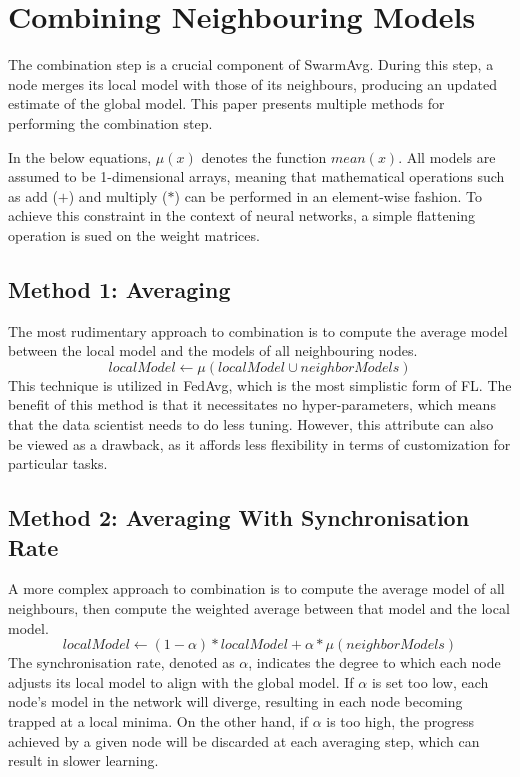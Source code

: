 \section{Combining Neighbouring Models} \label{mcm}
The combination step is a crucial component of SwarmAvg. During this step, a node merges its local model with those of its neighbours, producing an updated estimate of the global model. This paper presents multiple methods for performing the combination step.

In the below equations, $\mu(x)$ denotes the function $mean(x)$. All models are assumed to be 1-dimensional arrays, meaning that mathematical operations such as add ($+$) and multiply ($*$) can be performed in an element-wise fashion. To achieve this constraint in the context of neural networks, a simple flattening operation is sued on the weight matrices.

\subsection{Method 1: Averaging}
The most rudimentary approach to combination is to compute the average model between the local model and the models of all neighbouring nodes.
\[ localModel \gets \mu(localModel \cup neighborModels) \]
This technique is utilized in FedAvg, which is the most simplistic form of FL. The benefit of this method is that it necessitates no hyper-parameters, which means that the data scientist needs to do less tuning. However, this attribute can also be viewed as a drawback, as it affords less flexibility in terms of customization for particular tasks.

\subsection{Method 2: Averaging With Synchronisation Rate}
A more complex approach to combination is to compute the average model of all neighbours, then compute the weighted average between that model and the local model.
\[ localModel \gets (1 - \alpha) * localModel + \alpha * \mu(neighborModels) \]
The synchronisation rate, denoted as $\alpha$, indicates the degree to which each node adjusts its local model to align with the global model. If $\alpha$ is set too low, each node's model in the network will diverge, resulting in each node becoming trapped at a local minima. On the other hand, if $\alpha$ is too high, the progress achieved by a given node will be discarded at each averaging step, which can result in slower learning.

